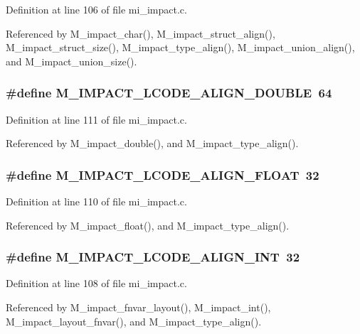 Definition at line 106 of file mi\_\-impact.c.

Referenced by M\_\-impact\_\-char(), M\_\-impact\_\-struct\_\-align(), M\_\-impact\_\-struct\_\-size(), M\_\-impact\_\-type\_\-align(), M\_\-impact\_\-union\_\-align(), and M\_\-impact\_\-union\_\-size().
\subsubsection{\setlength{\rightskip}{0pt plus 5cm}\#define M\_\-IMPACT\_\-LCODE\_\-ALIGN\_\-DOUBLE~64}\label{mi__impact_8c_3c026ec87ce09894c2f0ba847ed8fb01}




Definition at line 111 of file mi\_\-impact.c.

Referenced by M\_\-impact\_\-double(), and M\_\-impact\_\-type\_\-align().
\subsubsection{\setlength{\rightskip}{0pt plus 5cm}\#define M\_\-IMPACT\_\-LCODE\_\-ALIGN\_\-FLOAT~32}\label{mi__impact_8c_749055d25dc0191163d1937fb0fe3d0b}




Definition at line 110 of file mi\_\-impact.c.

Referenced by M\_\-impact\_\-float(), and M\_\-impact\_\-type\_\-align().
\subsubsection{\setlength{\rightskip}{0pt plus 5cm}\#define M\_\-IMPACT\_\-LCODE\_\-ALIGN\_\-INT~32}\label{mi__impact_8c_001d96e2308e9a88f77a4e64cc365fe0}




Definition at line 108 of file mi\_\-impact.c.

Referenced by M\_\-impact\_\-fnvar\_\-layout(), M\_\-impact\_\-int(), M\_\-impact\_\-layout\_\-fnvar(), and M\_\-impact\_\-type\_\-align().
